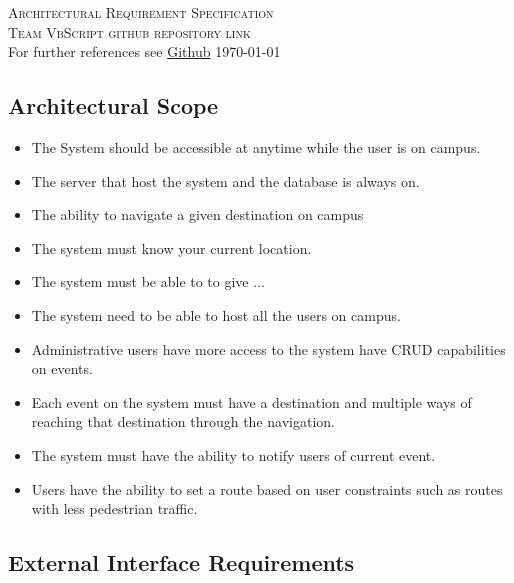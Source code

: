 \documentclass[a4paper,12pt]{report}
\begin{document}
\renewcommand{\thesection}{\arabic{section}}
\newpage
\begin{center}
	\textsc{\LARGE Architectural Requirement Specification}\\[1.5cm]
	\textsc{\Large Team VbScript github repository link}\\[0.5cm]
	For further references see \href{https://github.com/mfanamasimula/VBScript}{Github}
	\today
\end{center}
\newpage
\subsection{Architectural Scope}
\begin{itemize}
	\item The System should be accessible at anytime while the user is on campus.
	\item The server that host the system and the database is always on.
	\item The ability to navigate a given destination on campus
	\item The system must know your current location.
	\item The system must be able to to give ...
	\item The system need to be able to host all the users on campus.
	\item Administrative users have more access to the system have CRUD capabilities on events.
	\item Each event on the system must have a destination and multiple ways of reaching that destination through the navigation.
	\item The system must have the ability to notify users of current event.
	\item Users have the ability to set a route based on user constraints such as routes with less pedestrian traffic. 
\end{itemize}
\newpage
\subsection{External Interface Requirements}
\end{document}
